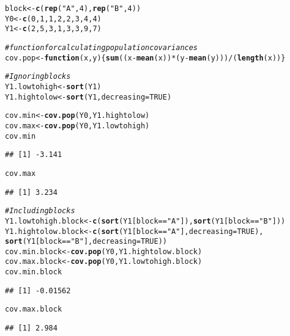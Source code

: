 \documentclass[11pt,notitlepage]{article}\usepackage[]{graphicx}\usepackage[]{color}
\makeatletter
\newcommand{\hlnum}[1]{\textcolor[rgb]{0.686,0.059,0.569}{#1}}%
\newcommand{\hlstr}[1]{\textcolor[rgb]{0.192,0.494,0.8}{#1}}%
\newcommand{\hlcom}[1]{\textcolor[rgb]{0.678,0.584,0.686}{\textit{#1}}}%
\newcommand{\hlopt}[1]{\textcolor[rgb]{0,0,0}{#1}}%
\newcommand{\hlstd}[1]{\textcolor[rgb]{0.345,0.345,0.345}{#1}}%
\newcommand{\hlkwa}[1]{\textcolor[rgb]{0.161,0.373,0.58}{\textbf{#1}}}%
\newcommand{\hlkwb}[1]{\textcolor[rgb]{0.69,0.353,0.396}{#1}}%
\newcommand{\hlkwc}[1]{\textcolor[rgb]{0.333,0.667,0.333}{#1}}%
\newcommand{\hlkwd}[1]{\textcolor[rgb]{0.737,0.353,0.396}{\textbf{#1}}}%
\newenvironment{kframe}{%
 \def\at@end@of@kframe{}%
 \ifinner\ifhmode%
  \def\at@end@of@kframe{\end{minipage}}%
  \begin{minipage}{\columnwidth}%
 \fi\fi%
 \def\FrameCommand##1{\hskip\@totalleftmargin \hskip-\fboxsep
 \colorbox{shadecolor}{##1}\hskip-\fboxsep
     \hskip-\linewidth \hskip-\@totalleftmargin \hskip\columnwidth}%
 \MakeFramed {\advance\hsize-\width
   \@totalleftmargin\z@ \linewidth\hsize
   \@setminipage}}%
 {\par\unskip\endMakeFramed%
 \at@end@of@kframe}
\newenvironment{knitrout}{}{} %
\makeatother
\begin{document}
\begin{knitrout}
\color{fgcolor}\begin{kframe}
\begin{alltt}
\hlstd{block} \hlkwb{<-} \hlkwd{c}\hlstd{(}\hlkwd{rep}\hlstd{(}\hlstr{"A"}\hlstd{,} \hlnum{4}\hlstd{),} \hlkwd{rep}\hlstd{(}\hlstr{"B"}\hlstd{,} \hlnum{4}\hlstd{))}
\hlstd{Y0} \hlkwb{<-} \hlkwd{c}\hlstd{(}\hlnum{0}\hlstd{,}\hlnum{1}\hlstd{,}\hlnum{1}\hlstd{,}\hlnum{2}\hlstd{,}\hlnum{2}\hlstd{,}\hlnum{3}\hlstd{,}\hlnum{4}\hlstd{,}\hlnum{4}\hlstd{)}
\hlstd{Y1} \hlkwb{<-} \hlkwd{c}\hlstd{(}\hlnum{2}\hlstd{,}\hlnum{5}\hlstd{,}\hlnum{3}\hlstd{,}\hlnum{1}\hlstd{,}\hlnum{3}\hlstd{,}\hlnum{3}\hlstd{,}\hlnum{9}\hlstd{,}\hlnum{7}\hlstd{)}

\hlcom{# function for calculating population covariances}
\hlstd{cov.pop} \hlkwb{<-} \hlkwa{function}\hlstd{(}\hlkwc{x}\hlstd{,}\hlkwc{y}\hlstd{)\{}\hlkwd{sum}\hlstd{((x}\hlopt{-}\hlkwd{mean}\hlstd{(x))}\hlopt{*}\hlstd{(y}\hlopt{-}\hlkwd{mean}\hlstd{(y)))}\hlopt{/}\hlstd{(}\hlkwd{length}\hlstd{(x))\}}

\hlcom{# Ignoring blocks}
\hlstd{Y1.lowtohigh} \hlkwb{<-} \hlkwd{sort}\hlstd{(Y1)}
\hlstd{Y1.hightolow} \hlkwb{<-} \hlkwd{sort}\hlstd{(Y1,} \hlkwc{decreasing}\hlstd{=}\hlnum{TRUE}\hlstd{)}

\hlstd{cov.min} \hlkwb{<-} \hlkwd{cov.pop}\hlstd{(Y0, Y1.hightolow)}
\hlstd{cov.max} \hlkwb{<-} \hlkwd{cov.pop}\hlstd{(Y0, Y1.lowtohigh)}
\hlstd{cov.min}
\end{alltt}
\begin{verbatim}
## [1] -3.141
\end{verbatim}
\begin{alltt}
\hlstd{cov.max}
\end{alltt}
\begin{verbatim}
## [1] 3.234
\end{verbatim}
\begin{alltt}
\hlcom{# Including blocks}
\hlstd{Y1.lowtohigh.block} \hlkwb{<-} \hlkwd{c}\hlstd{(}\hlkwd{sort}\hlstd{(Y1[block}\hlopt{==}\hlstr{"A"}\hlstd{]),} \hlkwd{sort}\hlstd{(Y1[block}\hlopt{==}\hlstr{"B"}\hlstd{]))}
\hlstd{Y1.hightolow.block} \hlkwb{<-} \hlkwd{c}\hlstd{(}\hlkwd{sort}\hlstd{(Y1[block}\hlopt{==}\hlstr{"A"}\hlstd{],}\hlkwc{decreasing}\hlstd{=}\hlnum{TRUE}\hlstd{),}
                        \hlkwd{sort}\hlstd{(Y1[block}\hlopt{==}\hlstr{"B"}\hlstd{],}\hlkwc{decreasing}\hlstd{=}\hlnum{TRUE}\hlstd{))}
\hlstd{cov.min.block} \hlkwb{<-} \hlkwd{cov.pop}\hlstd{(Y0, Y1.hightolow.block)}
\hlstd{cov.max.block} \hlkwb{<-} \hlkwd{cov.pop}\hlstd{(Y0, Y1.lowtohigh.block)}
\hlstd{cov.min.block}
\end{alltt}
\begin{verbatim}
## [1] -0.01562
\end{verbatim}
\begin{alltt}
\hlstd{cov.max.block}
\end{alltt}
\begin{verbatim}
## [1] 2.984
\end{verbatim}
\end{kframe}
\end{knitrout}
\end{document}
